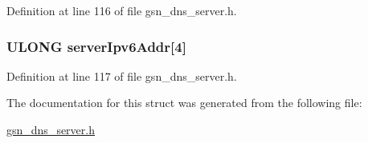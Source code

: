 Definition at line 116 of file gsn\_\-dns\_\-server.h.

\hypertarget{a00054_a7f1f7891e264201060f498798b450a8b}{
\subsubsection[{serverIpv6Addr}]{\setlength{\rightskip}{0pt plus 5cm}ULONG {\bf serverIpv6Addr}\mbox{[}4\mbox{]}}}
\label{a00054_a7f1f7891e264201060f498798b450a8b}


Definition at line 117 of file gsn\_\-dns\_\-server.h.



The documentation for this struct was generated from the following file:\begin{DoxyCompactItemize}
\item 
\hyperlink{a00485}{gsn\_\-dns\_\-server.h}\end{DoxyCompactItemize}
